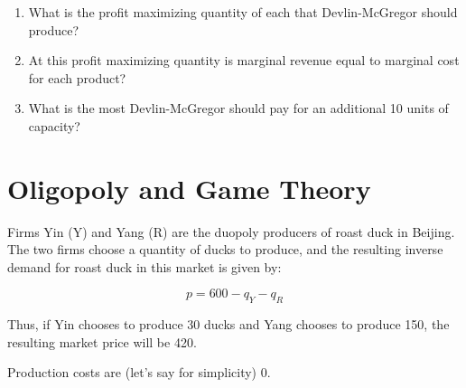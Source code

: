 \documentclass{article}
\begin{document}
\begin{enumerate}
\item What is the profit maximizing quantity of each that Devlin-McGregor should produce?
\item At this profit maximizing quantity is marginal revenue equal to marginal cost for each product?
\item What is the most Devlin-McGregor should pay for an additional 10 units of capacity?
\end{enumerate}

\section*{Oligopoly and Game Theory}

Firms Yin (Y) and Yang (R) are the duopoly producers of roast duck in Beijing. The two firms choose a quantity of ducks to produce, and the resulting inverse demand for roast duck in this market is given by:

\[ p = 600 - q_Y - q_R \]

Thus, if Yin chooses to produce 30 ducks and Yang chooses to produce 150, the resulting market price will be 420.

Production costs are (let's say for simplicity) 0.
\end{document}
